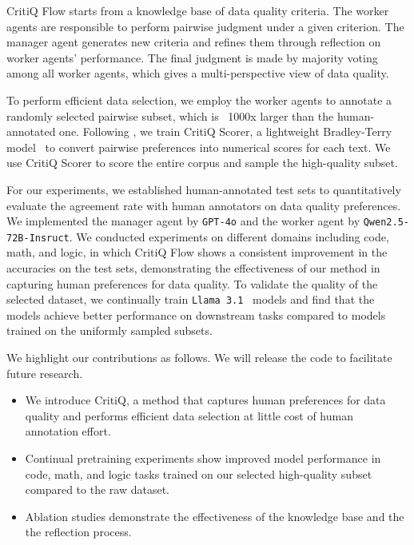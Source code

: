 CritiQ Flow starts from a knowledge base of data quality criteria. The worker
agents are responsible to perform pairwise judgment under a given
criterion. The manager agent generates new criteria and refines them through reflection
on worker agents' performance. The final judgment is made by majority voting among
all worker agents, which gives a multi-perspective view of data quality.

To perform efficient data selection, we employ the worker agents to annotate a randomly
selected pairwise subset, which is ~1000x larger than the human-annotated one.
Following \citet{korbak_pretraining_2023,wettig_qurating_2024}, we train CritiQ
Scorer, a lightweight Bradley-Terry model~\citep{bradley_rank_1952} to convert
pairwise preferences into numerical scores for each text. We use CritiQ Scorer to
score the entire corpus and sample the high-quality subset.

For our experiments, we established human-annotated test sets to quantitatively
evaluate the agreement rate with human annotators on data quality preferences. We implemented the manager agent by \texttt{GPT-4o} and the worker
agent by \texttt{Qwen2.5-72B-Insruct}. We conducted experiments on different
domains including code, math, and logic, in which CritiQ Flow shows a consistent
improvement in the accuracies on the test sets, demonstrating the effectiveness
of our method in capturing human preferences for data quality. To validate the quality
of the selected dataset, we continually train \texttt{Llama 3.1}~\citep{dubey_llama_2024}
models and find that the models achieve better performance on downstream tasks
compared to models trained on the uniformly sampled subsets.

We highlight our contributions as follows. We will release the code to facilitate
future research.

\begin{itemize}
    \item We introduce CritiQ, a method that captures human preferences for data
        quality and performs efficient data selection at little cost of human
        annotation effort.

    \item Continual pretraining experiments show improved model performance in code,
        math, and logic tasks trained on our selected high-quality subset compared to the raw dataset.

    \item Ablation studies demonstrate the effectiveness of the knowledge base and
        the the reflection process.
\end{itemize}

